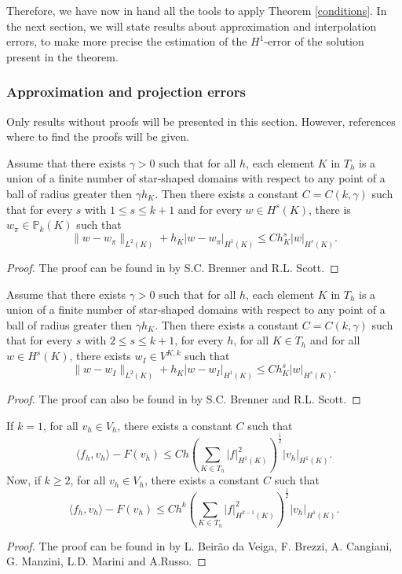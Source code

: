 Therefore, we have now in hand all the tools to apply Theorem \ref{conditions}. In the next section, we will state results about approximation and interpolation errors, to make more precise the estimation of the $H^1$-error of the solution present in the theorem. 

\subsubsection{Approximation and projection errors}
Only results without proofs will be presented in this section. However, references where to find the proofs will be given. 

\begin{theorem}
Assume that there exists $\gamma>0$ such that for all $h$, each element $K$ in $T_h$ is a union of a finite number of star-shaped domains with respect to any point of a ball of radius greater then $\gamma h_K$. Then there exists a constant $C = C(k,\gamma)$ such that for every $s$ with $1\leq s\leq k+1$ and for every $w\in H^s(K)$, there is $w_\pi\in\mathbb{P}_k(K)$ such that 
$$
\|w-w_\pi\|_{L^2(K)} + h_K|w-w_\pi|_{H^1(K)} \leq Ch_K^s|w|_{H^s(K)}.
$$
\end{theorem}
\begin{proof}
The proof can be found in \cite{brennerscott} by S.C. Brenner and R.L. Scott.
\end{proof}

\begin{theorem}
Assume that there exists $\gamma>0$ such that for all $h$, each element $K$ in $T_h$ is a union of a finite number of star-shaped domains with respect to any point of a ball of radius greater then $\gamma h_K$. Then there exists a constant $C=C(k,\gamma)$ such that for every $s$ with $2\leq s\leq k+1$, for every $h$, for all $K\in T_h$ and for all $w\in H^s(K)$, there exists $w_I\in V^{K,k}$ such that
$$
\|w-w_I\|_{L^2(K)} + h_K|w-w_I|_{H^1(K)} \leq Ch_K^s|w|_{H^s(K)}.
$$
\end{theorem}
\begin{proof}
The proof can also be found in \cite{brennerscott} by S.C. Brenner and R.L. Scott.
\end{proof}

\begin{theorem}
If $k=1$, for all $v_h\in V_h$, there exists a constant $C$ such that
$$
\langle f_h, v_h\rangle - F(v_h) \leq Ch\left(\sum_{K\in T_h} |f|^2_{H^1(K)}\right)^{\frac{1}{2}}|v_h|_{H^1(K)}.
$$
Now, if $k\geq 2$, for all $v_h\in V_h$, there exists a constant $C$ such that 
$$
\langle f_h, v_h\rangle - F(v_h) \leq Ch^k\left(\sum_{K\in T_h} |f|^2_{H^{k-1}(K)}\right)^{\frac{1}{2}}|v_h|_{H^1(K)}.
$$
\end{theorem}
\begin{proof}
The proof can be found in \cite{basicpples} by L. Beirão da Veiga, F. Brezzi, A. Cangiani, G. Manzini, L.D. Marini and A.Russo. 
\end{proof}
